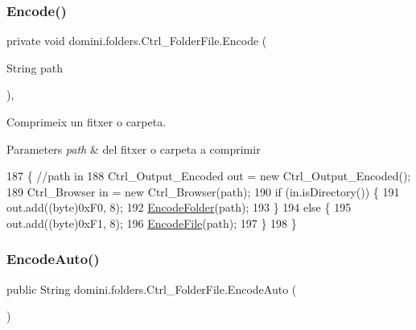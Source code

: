 \subsubsection{\texorpdfstring{Encode()}{Encode()}\hspace{0.1cm}{\footnotesize\ttfamily [2/2]}}
{\footnotesize\ttfamily private void domini.\+folders.\+Ctrl\+\_\+\+Folder\+File.\+Encode (\begin{DoxyParamCaption}\item[{String}]{path }\end{DoxyParamCaption})\hspace{0.3cm}{\ttfamily [inline]}, {\ttfamily [private]}}



Comprimeix un fitxer o carpeta. 


\begin{DoxyParams}{Parameters}
{\em path} & del fitxer o carpeta a comprimir \\
\hline
\end{DoxyParams}

\begin{DoxyCode}
187                                      \{ \textcolor{comment}{//path in}
188         Ctrl\_Output\_Encoded out = \textcolor{keyword}{new} Ctrl\_Output\_Encoded();
189         Ctrl\_Browser in = \textcolor{keyword}{new} Ctrl\_Browser(path);
190         \textcolor{keywordflow}{if} (in.isDirectory()) \{
191             out.add((byte)0xF0, 8);
192             \hyperlink{classdomini_1_1folders_1_1Ctrl__FolderFile_a6b18175639009f0186307710fb88a18f}{EncodeFolder}(path);
193         \}
194         \textcolor{keywordflow}{else} \{
195             out.add((byte)0xF1, 8);
196             \hyperlink{classdomini_1_1folders_1_1Ctrl__FolderFile_a0b2b642b6c23124539d0306955be7f0c}{EncodeFile}(path);
197         \}
198     \}
\end{DoxyCode}
\mbox{\label{classdomini_1_1folders_1_1Ctrl__FolderFile_aa88b27fc271590c8c16642db5c1bb329}} 
\subsubsection{\texorpdfstring{Encode\+Auto()}{EncodeAuto()}}
{\footnotesize\ttfamily public String domini.\+folders.\+Ctrl\+\_\+\+Folder\+File.\+Encode\+Auto (\begin{DoxyParamCaption}{ }\end{DoxyParamCaption})\hspace{0.3cm}{\ttfamily [inline]}}



